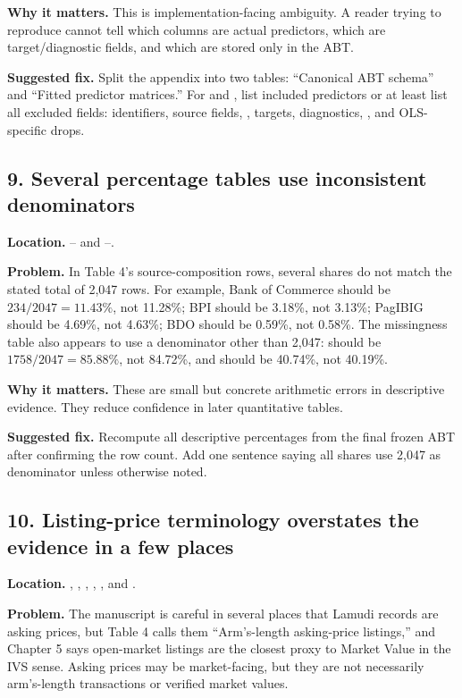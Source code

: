 \documentclass[11pt]{article}
\begin{document}
\textbf{Why it matters.} This is implementation-facing ambiguity. A reader trying to reproduce  cannot tell which columns are actual predictors, which are target/diagnostic fields, and which are stored only in the ABT.

\textbf{Suggested fix.} Split the appendix into two tables: ``Canonical ABT schema'' and ``Fitted predictor matrices.'' For  and , list included predictors or at least list all excluded fields: identifiers, source fields, , targets, diagnostics, , and OLS-specific drops.

\subsection*{9. Several percentage tables use inconsistent denominators}

\textbf{Location.} -- and --.

\textbf{Problem.} In Table 4's source-composition rows, several shares do not match the stated total of 2,047 rows. For example, Bank of Commerce should be $234/2047=11.43\%$, not 11.28\%; BPI should be 3.18\%, not 3.13\%; PagIBIG should be 4.69\%, not 4.63\%; BDO should be 0.59\%, not 0.58\%. The missingness table also appears to use a denominator other than 2,047:  should be $1758/2047=85.88\%$, not 84.72\%, and  should be 40.74\%, not 40.19\%.

\textbf{Why it matters.} These are small but concrete arithmetic errors in descriptive evidence. They reduce confidence in later quantitative tables.

\textbf{Suggested fix.} Recompute all descriptive percentages from the final frozen ABT after confirming the row count. Add one sentence saying all shares use 2,047 as denominator unless otherwise noted.

\subsection*{10. Listing-price terminology overstates the evidence in a few places}

\textbf{Location.} , , , , , and .

\textbf{Problem.} The manuscript is careful in several places that Lamudi records are asking prices, but Table 4 calls them ``Arm's-length asking-price listings,'' and Chapter 5 says open-market listings are the closest proxy to Market Value in the IVS sense. Asking prices may be market-facing, but they are not necessarily arm's-length transactions or verified market values.
\end{document}
